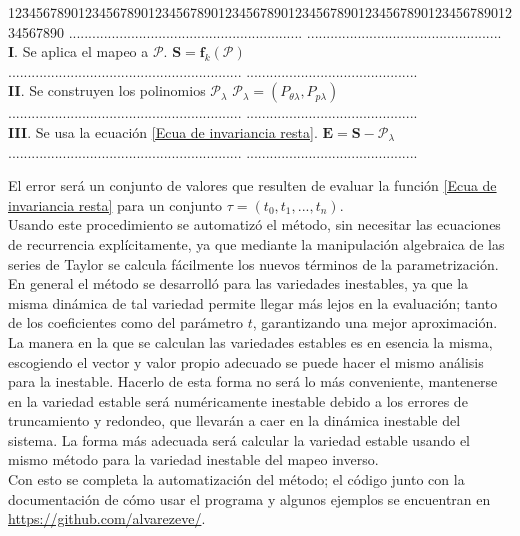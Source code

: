 \begin{tabbing}
12\=34567890123456789012345678901234567890123456\=7890123456789012345678901234567890\kill%
\>............................................................  \>..................................................\\
\>\textbf{I}. Se aplica el mapeo a $\mathcal{P}$.\> $\mathbf{S}=\mathbf{f}_{k}(\mathcal{P})$ \\
\> ............................................................ \>............................................\\
\>\textbf{II}. Se construyen los polinomios $\mathcal{P}_{\lambda}$\> $\mathcal{P}_{\lambda}=(P_{\theta\lambda},P_{p\lambda})$\\
\> ............................................................ \>............................................\\
\>\textbf{III}. Se usa la ecuación \eqref{Ecua de invariancia resta}.\> $\mathbf{E} =\mathbf{S}-\mathcal{P}_{\lambda}$\\
\> ............................................................ \>............................................\\

\end{tabbing}
El error será un conjunto de valores que resulten de evaluar la función \eqref{Ecua de invariancia resta} para un conjunto $\tau = ( t_{0},t_{1},..., t_{n} )$. \\

Usando este procedimiento se automatizó el método, sin necesitar las ecuaciones de recurrencia explícitamente, ya que mediante la manipulación algebraica de las series de Taylor se calcula fácilmente los nuevos términos de la parametrización. En general el método se desarrolló para las variedades inestables, ya que la misma dinámica de tal variedad permite llegar más lejos en la evaluación; tanto de los coeficientes como del parámetro $t$, garantizando una mejor aproximación. La manera en la que se calculan las variedades estables es en esencia la misma, escogiendo el vector y valor propio adecuado se puede hacer el mismo análisis para la inestable. Hacerlo de esta forma no será lo más conveniente, mantenerse en la variedad estable será numéricamente inestable debido a los errores de truncamiento y redondeo, que llevarán a caer en la dinámica inestable del sistema. La forma más adecuada será calcular la variedad estable usando el mismo método para la variedad inestable del mapeo inverso. \\



Con esto se completa la automatización del método; el código junto con la do\-cu\-men\-ta\-ción de cómo usar el programa y algunos ejemplos se encuentran en \url{https://github.com/alvarezeve/}. 






